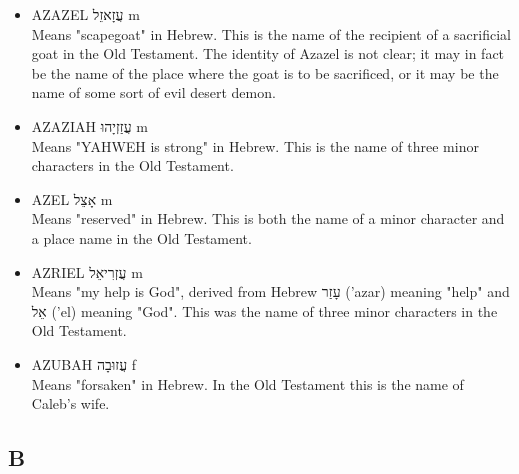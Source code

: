 \begin{itemize}
\item{AZAZEL עֲזָאזֵל m}\\
Means "scapegoat" in Hebrew. This is the name of the recipient of a sacrificial goat in the Old Testament. The identity of Azazel is not clear; it may in fact be the name of the place where the goat is to be sacrificed, or it may be the name of some sort of evil desert demon.
\item {AZAZIAH עֲזַזְיָהוּ m}\\
Means "YAHWEH is strong" in Hebrew. This is the name of three minor characters in the Old Testament.
\item {AZEL אָצֵל m}\\
Means "reserved" in Hebrew. This is both the name of a minor character and a place name in the Old Testament.
\item {AZRIEL עֲזְרִיאֵל m}\\
Means "my help is God", derived from Hebrew עָזַר ('azar) meaning "help" and אֵל ('el) meaning "God". This was the name of three minor characters in the Old Testament.
\item{AZUBAH עֲזוּבָה f}\\ 
Means "forsaken" in Hebrew. In the Old Testament this is the name of Caleb's wife.

\end{itemize}


\subsection{B}


